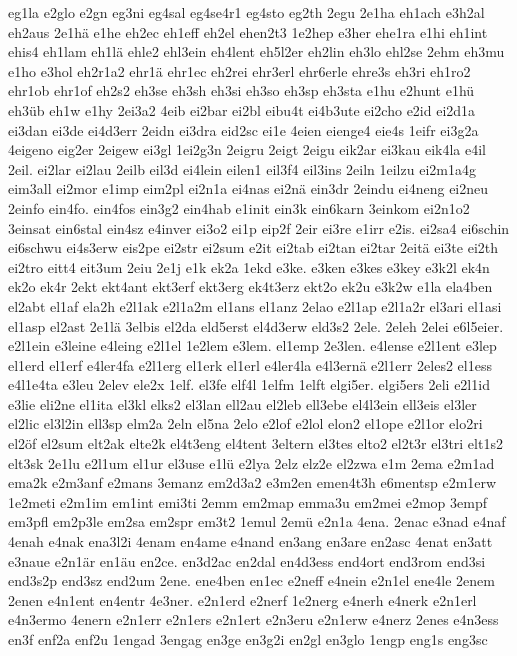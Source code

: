 {eg1la
e2glo
e2gn
eg3ni
eg4sal
eg4se4r1
eg4sto
eg2th
2egu
2e1ha
eh1ach
e3h2al
eh2aus
2e1hä
e1he
eh2ec
eh1eff
eh2el
ehen2t3
1e2hep
e3her
ehe1ra
e1hi
eh1int
ehis4
eh1lam
eh1lä
ehle2
ehl3ein
eh4lent
eh5l2er
eh2lin
eh3lo
ehl2se
2ehm
eh3mu
e1ho
e3hol
eh2r1a2
ehr1ä
ehr1ec
eh2rei
ehr3erl
ehr6erle
ehre3s
eh3ri
eh1ro2
ehr1ob
ehr1of
eh2s2
eh3se
eh3sh
eh3si
eh3so
eh3sp
eh3sta
e1hu
e2hunt
e1hü
eh3üb
eh1w
e1hy
2ei3a2
4eib
ei2bar
ei2bl
eibu4t
ei4b3ute
ei2cho
e2id
ei2d1a
ei3dan
ei3de
ei4d3err
2eidn
ei3dra
eid2sc
ei1e
4eien
eienge4
eie4s
1eifr
ei3g2a
4eigeno
eig2er
2eigew
ei3gl
1ei2g3n
2eigru
2eigt
2eigu
eik2ar
ei3kau
eik4la
e4il
2eil.
ei2lar
ei2lau
2eilb
eil3d
ei4lein
eilen1
eil3f4
eil3ins
2eiln
1eilzu
ei2m1a4g
eim3all
ei2mor
e1imp
eim2pl
ei2n1a
ei4nas
ei2nä
ein3dr
2eindu
ei4neng
ei2neu
2einfo
ein4fo.
ein4fos
ein3g2
ein4hab
e1init
ein3k
ein6karn
3einkom
ei2n1o2
3einsat
ein6stal
ein4sz
e4inver
ei3o2
ei1p
eip2f
2eir
ei3re
e1irr
e2is.
ei2sa4
ei6schin
ei6schwu
ei4s3erw
eis2pe
ei2str
ei2sum
e2it
ei2tab
ei2tan
ei2tar
2eitä
ei3te
ei2th
ei2tro
eitt4
eit3um
2eiu
2e1j
e1k
ek2a
1ekd
e3ke.
e3ken
e3kes
e3key
e3k2l
ek4n
ek2o
ek4r
2ekt
ekt4ant
ekt3erf
ekt3erg
ek4t3erz
ekt2o
ek2u
e3k2w
e1la
ela4ben
el2abt
el1af
ela2h
e2l1ak
e2l1a2m
el1ans
el1anz
2elao
e2l1ap
e2l1a2r
el3ari
el1asi
el1asp
el2ast
2e1lä
3elbis
el2da
eld5erst
el4d3erw
eld3s2
2ele.
2eleh
2elei
e6l5eier.
e2l1ein
e3leine
e4leing
e2l1el
1e2lem
e3lem.
el1emp
2e3len.
e4lense
e2l1ent
e3lep
el1erd
el1erf
e4ler4fa
e2l1erg
el1erk
el1erl
e4ler4la
e4l3ernä
e2l1err
2eles2
el1ess
e4l1e4ta
e3leu
2elev
ele2x
1elf.
el3fe
elf4l
1elfm
1elft
elgi5er.
elgi5ers
2eli
e2l1id
e3lie
eli2ne
el1ita
el3kl
elks2
el3lan
ell2au
el2leb
ell3ebe
el4l3ein
ell3eis
el3ler
el2lic
el3l2in
ell3sp
elm2a
2eln
el5na
2elo
e2lof
e2lol
elon2
el1ope
e2l1or
elo2ri
el2öf
el2sum
elt2ak
elte2k
el4t3eng
el4tent
3eltern
el3tes
elto2
el2t3r
el3tri
elt1s2
elt3sk
2e1lu
e2l1um
el1ur
el3use
e1lü
e2lya
2elz
elz2e
el2zwa
e1m
2ema
e2m1ad
ema2k
e2m3anf
e2mans
3emanz
em2d3a2
e3m2en
emen4t3h
e6mentsp
e2m1erw
1e2meti
e2m1im
em1int
emi3ti
2emm
em2map
emma3u
em2mei
e2mop
3empf
em3pfl
em2p3le
em2sa
em2spr
em3t2
1emul
2emü
e2n1a
4ena.
2enac
e3nad
e4naf
4enah
e4nak
ena3l2i
4enam
en4ame
e4nand
en3ang
en3are
en2asc
4enat
en3att
e3naue
e2n1är
en1äu
en2ce.
en3d2ac
en2dal
en4d3ess
end4ort
end3rom
end3si
end3s2p
end3sz
end2um
2ene.
ene4ben
en1ec
e2neff
e4nein
e2n1el
ene4le
2enem
2enen
e4n1ent
en4entr
4e3ner.
e2n1erd
e2nerf
1e2nerg
e4nerh
e4nerk
e2n1erl
e4n3ermo
4enern
e2n1err
e2n1ers
e2n1ert
e2n3eru
e2n1erw
e4nerz
2enes
e4n3ess
en3f
enf2a
enf2u
1engad
3engag
en3ge
en3g2i
en2gl
en3glo
1engp
eng1s
eng3sc
}

